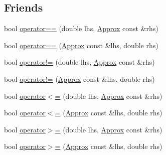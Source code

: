 \subsection*{Friends}
\begin{DoxyCompactItemize}
\item 
bool \hyperlink{classCatch_1_1Detail_1_1Approx_ac766f044f1c63f0c5997982baefd9049}{operator==} (double lhs, \hyperlink{classCatch_1_1Detail_1_1Approx}{Approx} const \&rhs)
\item 
bool \hyperlink{classCatch_1_1Detail_1_1Approx_a35999631e6cef569f9da9f3fa910db22}{operator==} (\hyperlink{classCatch_1_1Detail_1_1Approx}{Approx} const \&lhs, double rhs)
\item 
bool \hyperlink{classCatch_1_1Detail_1_1Approx_a83b3763569a7ecc143c335b630be0e47}{operator!=} (double lhs, \hyperlink{classCatch_1_1Detail_1_1Approx}{Approx} const \&rhs)
\item 
bool \hyperlink{classCatch_1_1Detail_1_1Approx_a7497ef839f8026cc0edd6269a80f3e09}{operator!=} (\hyperlink{classCatch_1_1Detail_1_1Approx}{Approx} const \&lhs, double rhs)
\item 
bool \hyperlink{classCatch_1_1Detail_1_1Approx_aa2bfad80c8c138eac1f0b56910a7d3f2}{operator$<$=} (double lhs, \hyperlink{classCatch_1_1Detail_1_1Approx}{Approx} const \&rhs)
\item 
bool \hyperlink{classCatch_1_1Detail_1_1Approx_a75c9382b61421ffab3559c3506182d8f}{operator$<$=} (\hyperlink{classCatch_1_1Detail_1_1Approx}{Approx} const \&lhs, double rhs)
\item 
bool \hyperlink{classCatch_1_1Detail_1_1Approx_a4e60095c615a0e6bdd6e8663cd24090b}{operator$>$=} (double lhs, \hyperlink{classCatch_1_1Detail_1_1Approx}{Approx} const \&rhs)
\item 
bool \hyperlink{classCatch_1_1Detail_1_1Approx_adaba11ee9aabb4d51d4855f09aa7f7df}{operator$>$=} (\hyperlink{classCatch_1_1Detail_1_1Approx}{Approx} const \&lhs, double rhs)
\end{DoxyCompactItemize}


